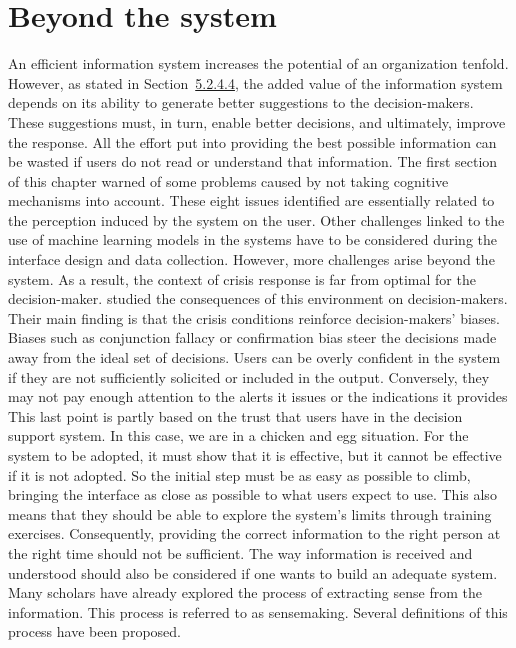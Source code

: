 \section{Beyond the system}
An efficient information system increases the potential of an organization tenfold.
However, as stated in Section~\hyperref[sec:information-distribution]{5.2.4.4}, the added value of the information system depends on its ability to generate better suggestions to the decision-makers.
These suggestions must, in turn, enable better decisions, and ultimately, improve the response.
All the effort put into providing the best possible information can be wasted if users do not read or understand that information.
The first section of this chapter warned of some problems caused by not taking cognitive mechanisms into account.
These eight issues identified are essentially related to the perception induced by the system on the user.
Other challenges linked to the use of machine learning models in the systems have to be considered during the interface design and data collection.
However, more challenges arise beyond the system.
As a result, the context of crisis response is far from optimal for the decision-maker.
\textcite{comesCognitiveBiasesHumanitarian2016} studied the consequences of this environment on decision-makers.
Their main finding is that the crisis conditions reinforce decision-makers' biases.
Biases such as conjunction fallacy or confirmation bias steer the decisions made away from the ideal set of decisions.
Users can be overly confident in the system if they are not sufficiently solicited or included in the output.
Conversely, they may not pay enough attention to the alerts it issues or the indications it provides
This last point is partly based on the trust that users have in the decision support system.
In this case, we are in a chicken and egg situation.
For the system to be adopted, it must show that it is effective, but it cannot be effective if it is not adopted.
So the initial step must be as easy as possible to climb, bringing the interface as close as possible to what users expect to use.
This also means that they should be able to explore the system's limits through training exercises.
Consequently, providing the correct information to the right person at the right time should not be sufficient.
The way information is received and understood should also be considered if one wants to build an adequate system.
Many scholars have already explored the process of extracting sense from the information.
This process is referred to as sensemaking.
Several definitions of this process have been proposed.
